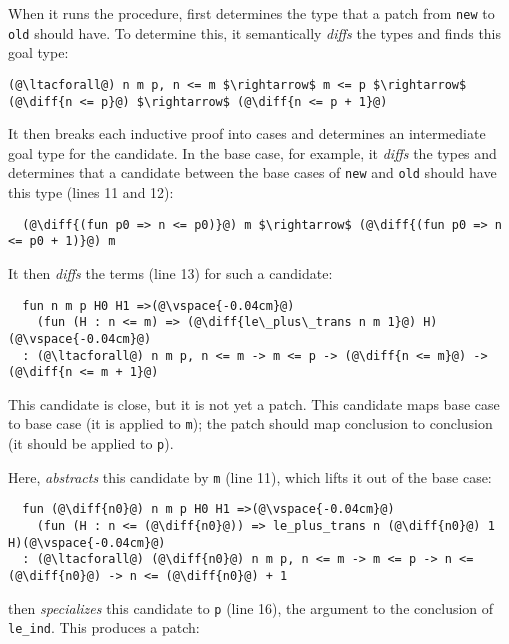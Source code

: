 When it runs the procedure,
\sysname first determines the type that a patch from \lstinline{new} to \lstinline{old} should have.
To determine this, it semantically \textit{diffs} the types and finds this goal type:

\begin{lstlisting}[language=coq]
  (@\ltacforall@) n m p, n <= m $\rightarrow$ m <= p $\rightarrow$ (@\diff{n <= p}@) $\rightarrow$ (@\diff{n <= p + 1}@)
\end{lstlisting}
It then breaks each inductive proof into cases and determines an intermediate goal type for the candidate.
In the base case, for example, it \textit{diffs} the types and determines that a candidate
between the base cases of \lstinline{new} and \lstinline{old} should have this type (lines 11 and 12):

\begin{lstlisting}
  (@\diff{(fun p0 => n <= p0)}@) m $\rightarrow$ (@\diff{(fun p0 => n <= p0 + 1)}@) m
\end{lstlisting}
It then \textit{diffs} the terms (line 13) for such a candidate:

\begin{lstlisting}
  fun n m p H0 H1 =>(@\vspace{-0.04cm}@)
    (fun (H : n <= m) => (@\diff{le\_plus\_trans n m 1}@) H)(@\vspace{-0.04cm}@)
  : (@\ltacforall@) n m p, n <= m -> m <= p -> (@\diff{n <= m}@) -> (@\diff{n <= m + 1}@)
\end{lstlisting}

This candidate is close, but it is not yet a patch. This candidate
maps base case to base case (it is applied to \lstinline{m}); the patch should map conclusion to conclusion (it should
be applied to \lstinline{p}).

Here, \sysname \textit{abstracts} this candidate by \lstinline{m} (line 11), which lifts it out of the base case:

\begin{lstlisting}
  fun (@\diff{n0}@) n m p H0 H1 =>(@\vspace{-0.04cm}@)
    (fun (H : n <= (@\diff{n0}@)) => le_plus_trans n (@\diff{n0}@) 1 H)(@\vspace{-0.04cm}@)
  : (@\ltacforall@) (@\diff{n0}@) n m p, n <= m -> m <= p -> n <= (@\diff{n0}@) -> n <= (@\diff{n0}@) + 1
\end{lstlisting}
\sysname then \textit{specializes} this candidate to \lstinline{p} (line 16), the argument
to the conclusion of \lstinline{le_ind}. This produces a patch:

